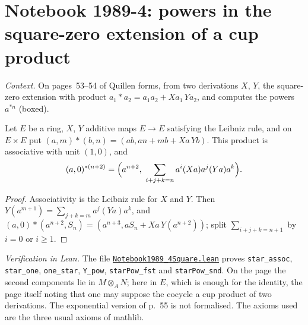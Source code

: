\section[Notebook 1989-4: powers in a square-zero extension]{Notebook 1989-4: powers in the square-zero extension of a cup product\protect{}}\label{sec:quillen-1989-4-square}

\emph{Context.} On pages~53--54 of  Quillen forms, from two derivations $X$, $Y$, the square-zero extension with product $a_1 * a_2 = a_1a_2 + Xa_1\,Ya_2$, and computes the powers $a^{*n}$ (boxed).

\begin{encadre}
\begin{theoreme}\label{thm:quillen-1989-4-square}
Let $E$ be a ring, $X$, $Y$ additive maps $E \to E$ satisfying the Leibniz rule, and on $E \times E$ put $(a, m)*(b, n) = (ab, an + mb + Xa\,Yb)$. This product is associative with unit $(1, 0)$, and
\[
(a, 0)^{*(n+2)} = \Bigl(a^{n+2},\ \sum_{i+j+k=n}a^i(Xa)a^j(Ya)a^k\Bigr).
\]
\end{theoreme}
\end{encadre}

\begin{proof}
Associativity is the Leibniz rule for $X$ and $Y$. Then $Y(a^{m+1}) = \sum_{j+k=m}a^j(Ya)a^k$, and $(a, 0)*(a^{n+2}, S_n) = (a^{n+3}, aS_n + Xa\,Y(a^{n+2}))$; split $\sum_{i+j+k=n+1}$ by $i = 0$ or $i \ge 1$.
\end{proof}

\emph{Verification in Lean.} The file \href{\leanblobmain/Notebook1989_4Square.lean}{\texttt{Notebook1989\_4Square.\allowbreak{}lean}} proves \texttt{star\_assoc}, \texttt{star\_one}, \texttt{one\_star}, \texttt{Y\_pow}, \texttt{starPow\_fst} and \texttt{starPow\_snd}. On the page the second components lie in $M \otimes_A N$; here in $E$, which is enough for the identity, the page itself noting that one may suppose the cocycle a cup product of two derivations. The exponential version of p.~55 is not formalised. The axioms used are the three usual axioms of mathlib.

